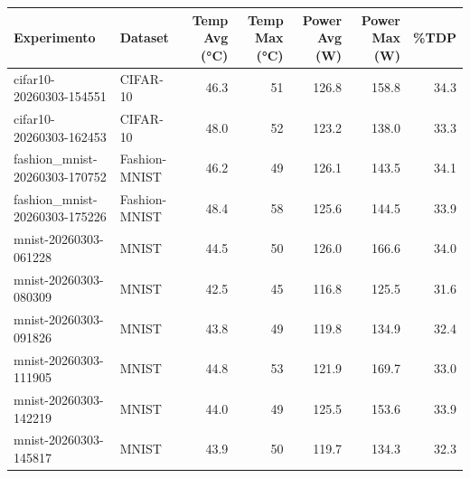 \begin{tabular}{llrrrrr}
\toprule
Experimento & Dataset & Temp Avg (°C) & Temp Max (°C) & Power Avg (W) & Power Max (W) & \%TDP \\
\midrule
cifar10-20260303-154551 & CIFAR-10 & 46.3 & 51 & 126.8 & 158.8 & 34.3 \\
cifar10-20260303-162453 & CIFAR-10 & 48.0 & 52 & 123.2 & 138.0 & 33.3 \\
fashion_mnist-20260303-170752 & Fashion-MNIST & 46.2 & 49 & 126.1 & 143.5 & 34.1 \\
fashion_mnist-20260303-175226 & Fashion-MNIST & 48.4 & 58 & 125.6 & 144.5 & 33.9 \\
mnist-20260303-061228 & MNIST & 44.5 & 50 & 126.0 & 166.6 & 34.0 \\
mnist-20260303-080309 & MNIST & 42.5 & 45 & 116.8 & 125.5 & 31.6 \\
mnist-20260303-091826 & MNIST & 43.8 & 49 & 119.8 & 134.9 & 32.4 \\
mnist-20260303-111905 & MNIST & 44.8 & 53 & 121.9 & 169.7 & 33.0 \\
mnist-20260303-142219 & MNIST & 44.0 & 49 & 125.5 & 153.6 & 33.9 \\
mnist-20260303-145817 & MNIST & 43.9 & 50 & 119.7 & 134.3 & 32.3 \\
\bottomrule
\end{tabular}